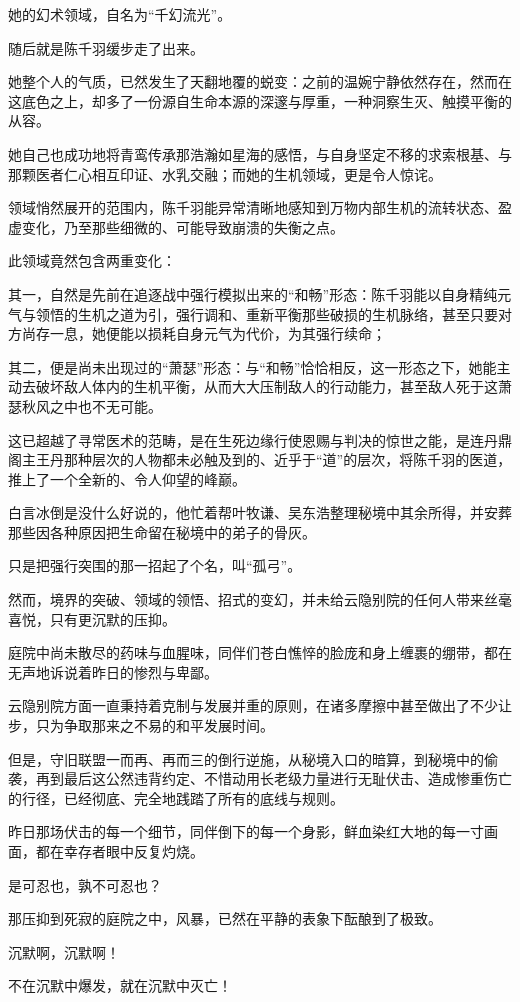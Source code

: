 她的幻术领域，自名为“千幻流光”。

随后就是陈千羽缓步走了出来。

她整个人的气质，已然发生了天翻地覆的蜕变：之前的温婉宁静依然存在，然而在这底色之上，却多了一份源自生命本源的深邃与厚重，一种洞察生灭、触摸平衡的从容。

她自己也成功地将青鸾传承那浩瀚如星海的感悟，与自身坚定不移的求索根基、与那颗医者仁心相互印证、水乳交融；而她的生机领域，更是令人惊诧。

领域悄然展开的范围内，陈千羽能异常清晰地感知到万物内部生机的流转状态、盈虚变化，乃至那些细微的、可能导致崩溃的失衡之点。

此领域竟然包含两重变化：

其一，自然是先前在追逐战中强行模拟出来的“和畅”形态：陈千羽能以自身精纯元气与领悟的生机之道为引，强行调和、重新平衡那些破损的生机脉络，甚至只要对方尚存一息，她便能以损耗自身元气为代价，为其强行续命；

其二，便是尚未出现过的“萧瑟”形态：与“和畅”恰恰相反，这一形态之下，她能主动去破坏敌人体内的生机平衡，从而大大压制敌人的行动能力，甚至敌人死于这萧瑟秋风之中也不无可能。

这已超越了寻常医术的范畴，是在生死边缘行使恩赐与判决的惊世之能，是连丹鼎阁主王丹那种层次的人物都未必触及到的、近乎于“道”的层次，将陈千羽的医道，推上了一个全新的、令人仰望的峰巅。

白言冰倒是没什么好说的，他忙着帮叶牧谦、吴东浩整理秘境中其余所得，并安葬那些因各种原因把生命留在秘境中的弟子的骨灰。

只是把强行突围的那一招起了个名，叫“孤弓”。

\vspace{2em}

然而，境界的突破、领域的领悟、招式的变幻，并未给云隐别院的任何人带来丝毫喜悦，只有更沉默的压抑。

庭院中尚未散尽的药味与血腥味，同伴们苍白憔悴的脸庞和身上缠裹的绷带，都在无声地诉说着昨日的惨烈与卑鄙。

云隐别院方面一直秉持着克制与发展并重的原则，在诸多摩擦中甚至做出了不少让步，只为争取那来之不易的和平发展时间。

但是，守旧联盟一而再、再而三的倒行逆施，从秘境入口的暗算，到秘境中的偷袭，再到最后这公然违背约定、不惜动用长老级力量进行无耻伏击、造成惨重伤亡的行径，已经彻底、完全地践踏了所有的底线与规则。

昨日那场伏击的每一个细节，同伴倒下的每一个身影，鲜血染红大地的每一寸画面，都在幸存者眼中反复灼烧。

是可忍也，孰不可忍也？

那压抑到死寂的庭院之中，风暴，已然在平静的表象下酝酿到了极致。

沉默啊，沉默啊！

不在沉默中爆发，就在沉默中灭亡！
